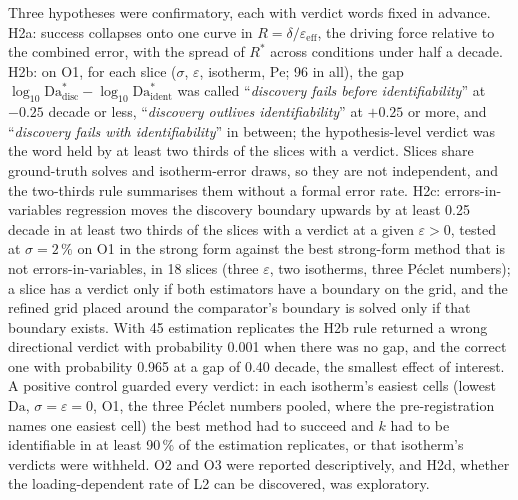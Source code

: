 \documentclass[11pt]{article}
\newcommand{\Da}{\mathrm{Da}}
\newcommand{\Pe}{\mathrm{Pe}}
\newcommand{\verdict}[1]{``\textit{#1}''}
\begin{document}
Three hypotheses were confirmatory, each with verdict words fixed in advance. H2a: success
collapses onto one curve in $R = \delta/\varepsilon_{\mathrm{eff}}$, the driving force
relative to the combined error, with the spread of $R^{*}$ across conditions under half a
decade. H2b: on O1, for each slice ($\sigma$, $\varepsilon$, isotherm, $\Pe$; 96 in all),
the gap $\log_{10}\Da^{*}_{\mathrm{disc}} - \log_{10}\Da^{*}_{\mathrm{ident}}$ was called
\verdict{discovery fails before identifiability} at $-0.25$ decade or less,
\verdict{discovery outlives identifiability} at $+0.25$ or more, and
\verdict{discovery fails with identifiability} in between; the hypothesis-level verdict was
the word held by at least two thirds of the slices with a verdict. Slices share ground-truth
solves and isotherm-error draws, so they are not independent, and the two-thirds rule summarises
them without a formal error rate. H2c: errors-in-variables
regression moves the discovery boundary upwards by at least 0.25 decade in at least two thirds
of the slices with a verdict at a given $\varepsilon > 0$, tested at $\sigma = 2\,\%$ on O1 in the
strong form against the best strong-form method that is not errors-in-variables, in 18 slices
(three $\varepsilon$, two isotherms, three P\'eclet numbers); a slice has a verdict only if both
estimators have a boundary on the grid, and the refined grid placed around the comparator's
boundary is solved only if that boundary exists. With 45 estimation replicates the H2b rule
returned a wrong directional verdict with probability 0.001 when there was no gap, and the
correct one with probability 0.965 at a gap of 0.40 decade, the smallest effect of interest.
A positive control guarded every verdict: in each isotherm's easiest cells (lowest $\Da$,
$\sigma = \varepsilon = 0$, O1, the three P\'eclet numbers pooled, where the pre-registration
names one easiest cell) the best method had to
succeed and $k$ had to be identifiable in at least 90\,\% of the estimation replicates, or that
isotherm's verdicts were withheld. O2 and O3 were
reported descriptively, and H2d, whether the loading-dependent rate of L2 can be discovered,
was exploratory.
\end{document}

